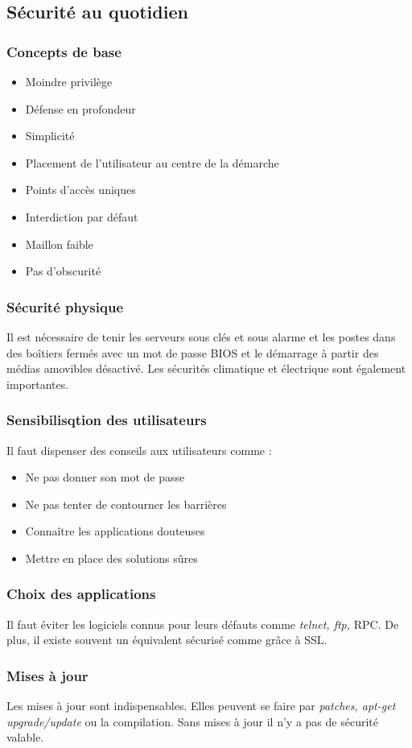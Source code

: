 \documentclass[12pt, a4paper]{article}
\begin{document}
	\subsection{Sécurité au quotidien}
	\subsubsection{Concepts de base}
	\begin{itemize}
		\item Moindre privilège
		\item Défense en profondeur
		\item Simplicité
		\item Placement de l'utilisateur au centre de la démarche
		\item Points d'accès uniques
		\item Interdiction par défaut
		\item Maillon faible
		\item Pas d'obscurité
	\end{itemize}
	\subsubsection{Sécurité physique}
	Il est nécessaire de tenir les serveurs sous clés et sous alarme et les postes dans des boîtiers fermés avec un mot de passe BIOS et le démarrage à partir des médias amovibles désactivé. Les sécurités climatique et électrique sont également importantes.
	\subsubsection{Sensibilisqtion des utilisateurs}
	Il faut dispenser des conseils aux utilisateurs comme :
	\begin{itemize}
		\item Ne pas donner son mot de passe
		\item Ne pas tenter de contourner les barrières
		\item Connaître les applications douteuses
		\item Mettre en place des solutions sûres
	\end{itemize}
	\subsubsection{Choix des applications}
	Il faut éviter les logiciels connus pour leurs défauts comme \textit{telnet, ftp,} RPC. De plus, il existe souvent un équivalent sécurisé comme grâce à SSL.
	\subsubsection{Mises à jour}
	Les mises à jour sont indispensables. Elles peuvent se faire par \textit{patches, apt-get upgrade/update} ou la compilation. Sans mises à jour il n'y a pas de sécurité valable.
\end{document}
